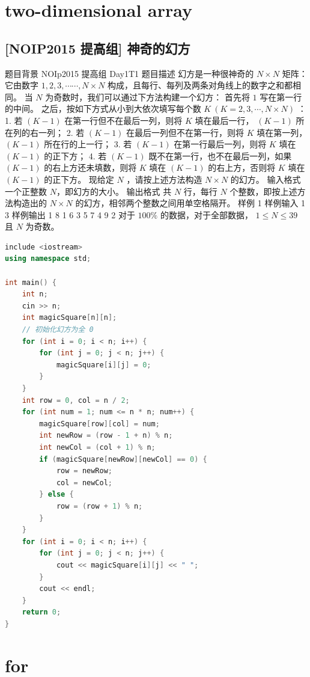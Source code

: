 \documentclass[12pt,twiside,a4paper]{ctexbook}
\numberwithin{chapter}{part}
\begin{document}
\chapter{two-dimensional array}
\section{[NOIP2015 提高组] 神奇的幻方}
题目背景
NOIp2015 提高组 Day1T1
 题目描述
幻方是一种很神奇的 $N\times N$ 矩阵：它由数字 $1,2,3,\cdots \cdots ,N \times N$ 构成，且每行、每列及两条对角线上的数字之和都相同。
当 $N$ 为奇数时，我们可以通过下方法构建一个幻方：
首先将 $1$ 写在第一行的中间。
之后，按如下方式从小到大依次填写每个数 $K \ (K=2,3,\cdots,N \times N)$ ：
1. 若 $(K-1)$ 在第一行但不在最后一列，则将 $K$ 填在最后一行， $(K-1)$ 所在列的右一列；
2. 若 $(K-1)$ 在最后一列但不在第一行，则将 $K$ 填在第一列， $(K-1)$ 所在行的上一行；
3. 若 $(K-1)$ 在第一行最后一列，则将 $K$ 填在 $(K-1)$ 的正下方；
4. 若 $(K-1)$ 既不在第一行，也不在最后一列，如果 $(K-1)$ 的右上方还未填数，则将 $K$ 填在 $(K-1)$ 的右上方，否则将 $K$ 填在 $(K-1)$ 的正下方。
现给定 $N$ ，请按上述方法构造 $N \times N$ 的幻方。
 输入格式
一个正整数 $N$，即幻方的大小。
 输出格式
共 $N$ 行，每行 $N$ 个整数，即按上述方法构造出的 $N \times N$ 的幻方，相邻两个整数之间用单空格隔开。
 样例 1
 样例输入 1
3
 样例输出 1
8 1 6
3 5 7
4 9 2
对于 $100\%$ 的数据，对于全部数据， $1 \leq N \leq 39$ 且 $N$ 为奇数。
\begin{lstlisting}[language=c++,breaklines=true]
include <iostream>
using namespace std;

int main() {
    int n;
    cin >> n;
    int magicSquare[n][n];
    // 初始化幻方为全 0
    for (int i = 0; i < n; i++) {
        for (int j = 0; j < n; j++) {
            magicSquare[i][j] = 0;
        }
    }
    int row = 0, col = n / 2;
    for (int num = 1; num <= n * n; num++) {
        magicSquare[row][col] = num;
        int newRow = (row - 1 + n) % n;
        int newCol = (col + 1) % n;
        if (magicSquare[newRow][newCol] == 0) {
            row = newRow;
            col = newCol;
        } else {
            row = (row + 1) % n;
        }
    }
    for (int i = 0; i < n; i++) {
        for (int j = 0; j < n; j++) {
            cout << magicSquare[i][j] << " ";
        }
        cout << endl;
    }
    return 0;
}
\end{lstlisting}

\chapter{for}
\end{document}
